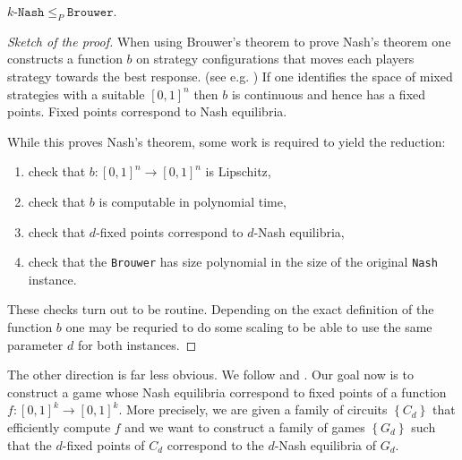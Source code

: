 \documentclass{article}
\begin{document}
\begin{theorem}
  $k\texttt{-Nash}\leq_P\texttt{Brouwer}$.
  \begin{proof}[Sketch of the proof]
    When using Brouwer's theorem to prove Nash's theorem one
    constructs a function $b$ on strategy configurations that
    moves each players strategy towards the best response.
    (see e.g. \cite{karsten2017})
    If one identifies the space of mixed strategies with a suitable
    $\left[{0,1}\right]^n$ then $b$ is continuous and hence has a
    fixed points. Fixed points correspond to Nash equilibria.

    While this proves Nash's theorem, some work is required to
    yield the reduction:
    \begin{enumerate}
      \item check that $b:\left[{0,1}\right]^n\to\left[{0,1}\right]^n$
        is Lipschitz,
      \item check that $b$ is computable in polynomial time,
      \item check that $d$-fixed points correspond to
        $d$-Nash equilibria,
      \item check that the \texttt{Brouwer} has size polynomial
        in the size of the original \texttt{Nash} instance.
    \end{enumerate}
    These checks turn out to be routine. Depending on the exact
    definition of the function $b$ one may be requried to do some
    scaling to be able to use the same parameter $d$ for both
    instances.
  \end{proof}
\end{theorem}

The other direction is far less obvious. We follow \cite{daskalakis2008}
and \cite{daskalakis2009}. Our goal now is to
construct a game whose Nash equilibria correspond to fixed points of
a function $f:\left[{0,1}\right]^k\to\left[{0,1}\right]^k$.
More precisely, we are given a family of circuits $\left\lbrace{C_d}\right\rbrace$ that efficiently compute $f$ and we want to construct a
family of games $\left\lbrace{G_d}\right\rbrace$ such that
the $d$-fixed points of $C_d$ correspond to the $d$-Nash equilibria of $G_d$.
\end{document}
